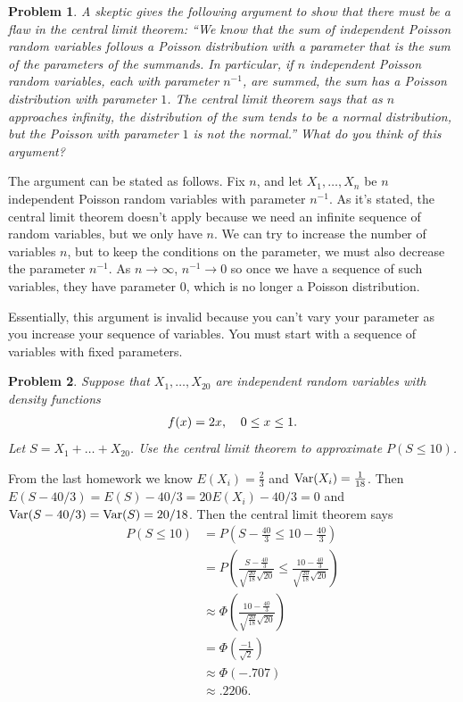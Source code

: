 \documentclass{article}
\newtheorem{problem}{Problem}
\newcommand{\var}{\textup{Var}}
\begin{document}
\begin{problem}
A skeptic gives the following argument to show that there must be a flaw in the central limit theorem: ``We know that the sum of independent Poisson random variables follows a Poisson distribution with a parameter that is the sum of the parameters of the summands. In particular, if $n$ independent Poisson random variables, each with parameter $n^{-1}$, are summed, the sum has a Poisson distribution with parameter $1$. The central limit theorem says that as $n$ approaches infinity, the distribution of the sum tends to be a normal distribution, but the Poisson with parameter $1$ is not the normal.'' What do you think of this argument?
\end{problem}

The argument can be stated as follows. Fix $n$, and let $X_1, \dots , X_n$ be $n$ independent Poisson random variables with parameter $n^{-1}$. As it's stated, the central limit theorem doesn't apply because we need an infinite sequence of random variables, but we only have $n$. We can try to increase the number of variables $n$, but to keep the conditions on the parameter, we must also decrease the parameter $n^{-1}$. As $n \rightarrow \infty$, $n^{-1} \rightarrow 0$ so once we have a sequence of such variables, they have parameter $0$, which is no longer a Poisson distribution.

Essentially, this argument is invalid because you can't vary your parameter as you increase your sequence of variables. You must start with a sequence of variables with fixed parameters.

\begin{problem}
Suppose that $X_1, \dots , X_{20}$ are independent random variables with density functions
\[
\begin{tabular}{cc}
$f(x) = 2x$, & $0 \leq x \leq 1$.
\end{tabular}
\]
Let $S = X_1 + \dots + X_{20}$. Use the central limit theorem to approximate $P(S \leq 10)$.
\end{problem}

From the last homework we know $E(X_i) = \frac{2}{3}$ and $\var(X_i) = \frac{1}{18}$. Then $E(S - 40/3) = E(S) - 40/3 = 20 E(X_i) - 40/3 = 0$ and $\var(S - 40/3) = \var(S) = 20/18$. Then the central limit theorem says
\begin{align*}
P(S \leq 10)
&= P \left ( S - \frac{40}{3} \leq 10 - \frac{40}{3} \right )\\
&= P \left ( \frac{S - \frac{40}{3}}{\sqrt{\frac{20}{18}} \sqrt{20}} \leq \frac{10 - \frac{40}{3}}{\sqrt{\frac{20}{18}} \sqrt{20}} \right )\\
&\approx \Phi \left ( \frac{10 - \frac{40}{3}}{\sqrt{\frac{20}{18}} \sqrt{20}} \right )\\
&= \Phi \left ( \frac{-1}{\sqrt{2}} \right )\\
&\approx \Phi(-.707)\\
&\approx .2206.
\end{align*}
\end{document}
